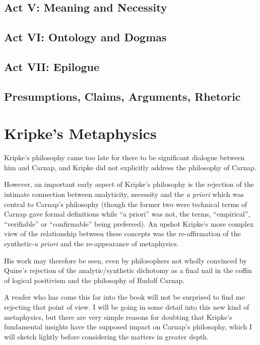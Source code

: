 \section{Act V: Meaning and Necessity}

\section{Act VI: Ontology and Dogmas}

\section{Act VII: Epilogue}

\section{Presumptions, Claims, Arguments, Rhetoric}

\chapter{Kripke's Metaphysics}

Kripke's philosophy came too late for there to be significant dialogue
between him and Carnap, and Kripke did not explicitly address the
philosophy of Carnap.

However, an important early aspect of Kripke's philosophy is the rejection
of the intimate connection between analyticity, necessity and the \emph{a priori}
which was central to Carnap's philosophy (though the former two were
technical terms of Carnap gave formal definitions while ``a priori'' was
not, the terms, ``empirical'', ``verifiable'' or ``confirmable'' being preferred).
An upshot Kripke's more complex view of the relationship between these concepts
was the re-affirmation of the synthetic-\emph{a priori} and the re-appearance of
metaphysics.

His work may therefore be seen, even by philosophers not wholly convinced
by Quine's rejection of the analytic/synthetic dichotomy as a final nail
in the coffin of logical positivism and the philosophy of Rudolf Carnap.

A reader who has come this far into the book will not be surprised to find
me rejecting that point of view.
I will be going in some detail into this new kind of metaphysics, but there
are very simple reasons for doubting that Kripke's fundamental insights have
the supposed impact on Carnap's philosophy, which I will sketch lightly
before considering the matters in greater depth.

